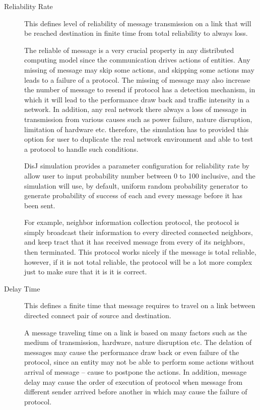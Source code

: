 \begin{description}
\item[Reliability Rate]
This defines level of reliability of message transmission on a link that will be reached destination in finite time from total reliability to always loss.

The reliable of message is a very crucial property in any distributed computing model since the communication drives actions of entities. Any missing of message may skip some actions, and skipping some actions may leads to a failure of a protocol. The missing of message may also increase the number of message to resend if protocol has a detection mechanism, in which it will lead to the performance draw back and traffic intensity in a network. In addition, any real network there always a loss of message in transmission from various causes such as power failure, nature disruption, limitation of hardware etc. therefore, the simulation has to provided this option for user to duplicate the real network environment and able to test a protocol to handle such conditions.

DisJ simulation provides a parameter configuration for reliability rate by allow user to input probability number between 0 to 100 inclusive, and the simulation will use, by default, uniform random probability generator to generate probability of success of each and every message before it has been sent.

For example, neighbor information collection protocol, the protocol is simply broadcast their information to every directed connected neighbors, and keep tract that it has received message from every of its neighbors, then terminated. This protocol works nicely if the message is total reliable, however, if it is not total reliable, the protocol will be a lot more complex just to make sure that it is it is correct.


\item[Delay Time]
This defines a finite time that message requires to travel on a link between directed connect pair of source and destination.

A message traveling time on a link is based on many factors such as the medium of transmission, hardware, nature disruption etc. The delation of messages may cause the performance draw back or even failure of the protocol, since an entity may not be able to perform some actions without arrival of message -- cause to postpone the actions. In addition, message delay may cause the order of execution of protocol when message from different sender arrived before another in which may cause the failure of protocol.


\end{description}
